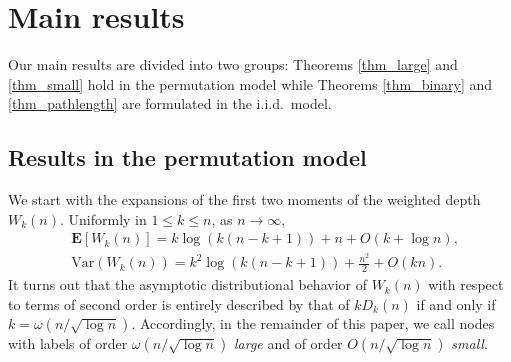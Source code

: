 \documentclass{amsart}       %
\newcommand{\E}[1]{\ensuremath{\mathbf{E} \left[#1 \right]}}
\begin{document}
\section{Main results} \label{sec main}
Our main results are divided into two groups: Theorems \ref{thm_large} and \ref{thm_small} hold in the permutation model while Theorems \ref{thm_binary} and \ref{thm_pathlength} are formulated in the i.i.d.\ model.

\subsection{Results in the permutation model}
We start with the expansions of the first two moments of the weighted depth $W_k(n)$. Uniformly in $1 \leq k \leq n$, as $n \to \infty$, 
\begin{align} 
& \E{W_k(n)} = k \log(k(n-k+1)) + n + O(k + \log n), \label{expansionW} \\ 
& \text{Var}(W_k(n)) = k^2 \log(k(n-k+1)) + \frac{n^2}{2} + O(kn). \label{expansionV} 
\end{align}
It turns out that the asymptotic distributional behavior of $W_k(n)$ with respect to terms of second order is entirely described by
that of $k D_k(n)$ if and only if $k = \omega(n / \sqrt{\log n})$.  \sloppy  Accordingly, in the remainder of this paper, we call nodes with labels of order \sloppy $\omega(n / \sqrt{\log n})$ \emph{large} and of order $O(n / \sqrt{\log n})$ \emph{small}. 
\end{document}
